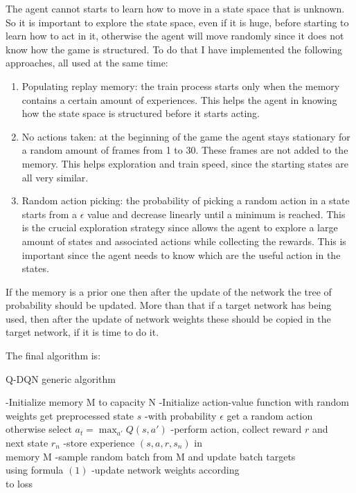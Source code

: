 \documentclass[10pt]{article}
\begin{document}
\begin{multicols}{2}
The agent cannot starts to learn how to move in a state space that is unknown. So it is important to explore the state space, even if it is huge, before starting to learn how to act in it, otherwise the agent will move randomly since it does not know how the game is structured. To do that I have implemented the following approaches, all used at the same time:

\begin{enumerate}
\item Populating replay memory: the train process starts only when the memory contains a certain amount of experiences. This helps the agent in knowing how the state space is structured before it starts acting.

\item No actions taken: at the beginning of the game the agent stays stationary for a random amount of frames from 1 to 30. These frames are not added to the memory. This helps exploration and train speed, since the starting states are all very similar. 

\item Random action picking: the probability of picking a random action in a state starts from a $\epsilon$ value and decrease linearly until a minimum is reached. This is the crucial exploration strategy since allows the agent to explore a large amount of states and associated actions while collecting the rewards. This is important since the agent needs to know which are the useful action in the states.
\end{enumerate}
If the memory is a prior one then after the update of the network the tree of probability should be updated. More than that if a target network has being used, then after the update of network weights these should be copied in the target network, if it is time to do it.

The final algorithm is: 

\begin{algorithm}[H]
\caption{Q-DQN generic algorithm}
\begin{algorithmic} 
\STATE -Initialize memory M to capacity N
\STATE -Initialize action-value function with random weights
\STATE get preprocessed state $s$
\STATE -with probability $\epsilon$ get a random action otherwise select $a_t=\max_{a'} Q(s, a')$ 
\STATE -perform action, collect reward $r$ and \\ next state $r_n$
\STATE -store experience $(s, a, r, s_n)$ in \\ memory M
\STATE -sample random batch from M and
\STATE update batch targets 
\\ using formula $(1)$
\STATE -update network weights according \\ to loss
\ENDIF
\ENDWHILE
\ENDFOR
\end{algorithmic}
\end{algorithm}


\end{multicols}
\end{document}
